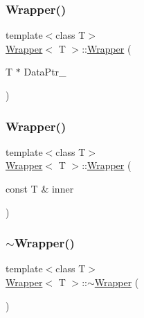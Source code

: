 \hypertarget{classWrapper_aa9b924715f9db9487ebafbf6d8bc6e08}{}\label{classWrapper_aa9b924715f9db9487ebafbf6d8bc6e08} 
\subsubsection{\texorpdfstring{Wrapper()}{Wrapper()}\hspace{0.1cm}{\footnotesize\ttfamily [2/4]}}
{\footnotesize\ttfamily template$<$class T$>$ \\
\hyperlink{classWrapper}{Wrapper}$<$ T $>$\+::\hyperlink{classWrapper}{Wrapper} (\begin{DoxyParamCaption}\item[{T $\ast$}]{Data\+Ptr\+\_\+ }\end{DoxyParamCaption})\hspace{0.3cm}{\ttfamily [inline]}}

\hypertarget{classWrapper_a75fb68554d62529a071016d297018dea}{}\label{classWrapper_a75fb68554d62529a071016d297018dea} 
\subsubsection{\texorpdfstring{Wrapper()}{Wrapper()}\hspace{0.1cm}{\footnotesize\ttfamily [3/4]}}
{\footnotesize\ttfamily template$<$class T$>$ \\
\hyperlink{classWrapper}{Wrapper}$<$ T $>$\+::\hyperlink{classWrapper}{Wrapper} (\begin{DoxyParamCaption}\item[{const T \&}]{inner }\end{DoxyParamCaption})\hspace{0.3cm}{\ttfamily [inline]}}

\hypertarget{classWrapper_a5396fe1ce47468f5ceeec85eb423695d}{}\label{classWrapper_a5396fe1ce47468f5ceeec85eb423695d} 
\subsubsection{\texorpdfstring{$\sim$\+Wrapper()}{~Wrapper()}}
{\footnotesize\ttfamily template$<$class T$>$ \\
\hyperlink{classWrapper}{Wrapper}$<$ T $>$\+::$\sim$\hyperlink{classWrapper}{Wrapper} (\begin{DoxyParamCaption}{ }\end{DoxyParamCaption})\hspace{0.3cm}{\ttfamily [inline]}}


